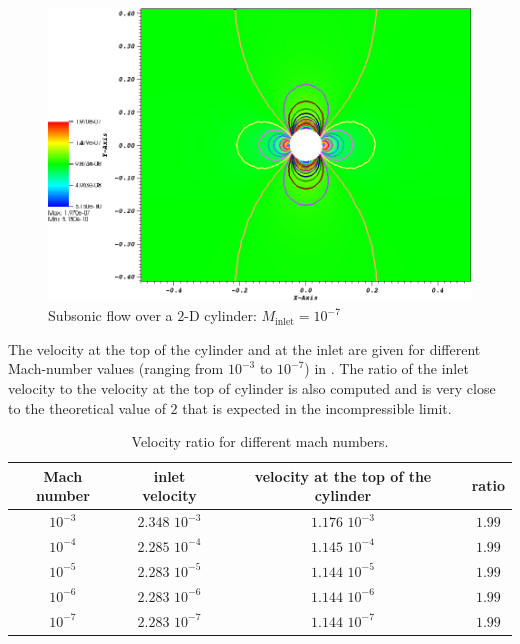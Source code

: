         \begin{figure}[H]
                \centering
                \includegraphics[width=\textwidth]{figures/CylinderMach1em7ZoomIn.png}
                \caption{Subsonic flow over a $2$-D cylinder: $M_{\text{inlet}}=10^{-7}$}
                \label{fig:cyl_1em7}
        \end{figure}
%
The velocity at the top of the cylinder and at the inlet are given for different Mach-number values (ranging from $10^{-3}$ to $10^{-7}$) in . The ratio of the inlet velocity to the velocity at the top of cylinder is also computed and is very close to the theoretical value of $2$ that is expected in the incompressible limit.
%
\begin{table}[H]
\begin{center}
 \caption{\label{tbl:velocity_ratio}Velocity ratio for different mach numbers.}
\begin{tabular}{|c|c|c|c|}
\hline
Mach number & inlet velocity & velocity at the top of the cylinder & ratio \\ \hline
$10^{-3}$ & $2.348$ $10^{-3}$ & $1.176$ $10^{-3}$& $1.99$  \\ \hline
$10^{-4}$ & $2.285$ $10^{-4}$ & $1.145$ $10^{-4}$& $1.99$  \\ \hline
$10^{-5}$ & $2.283$ $10^{-5}$ & $1.144$ $10^{-5}$ & $1.99$ \\ \hline
$10^{-6}$ & $2.283$ $10^{-6}$ & $1.144$ $10^{-6}$ & $1.99$ \\ \hline
$10^{-7}$ & $2.283$ $10^{-7}$ & $1.144$ $10^{-7}$ & $1.99$ \\ \hline
\end{tabular}
\end{center}
\nonumber
\end{table}
